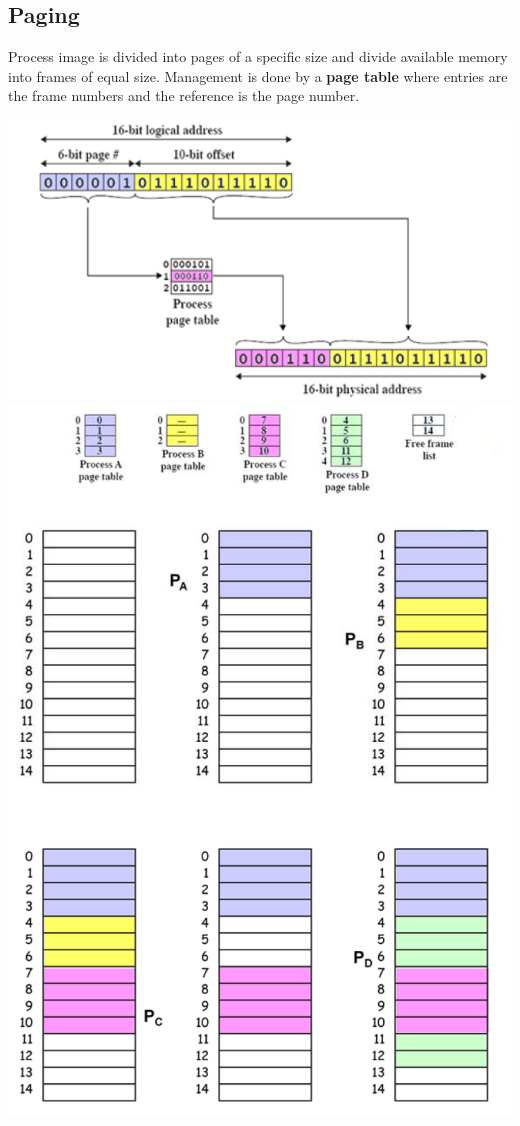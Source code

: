 	\subsection{Paging }
		Process image is divided into pages of a specific size and divide available memory into frames of equal size. Management is done by a \textbf{page table} where entries are the frame numbers and the reference is the page number. 
		
		\begin{multicols}{2}
			\includegraphics[scale=0.55]{./pictures/pagingAddressTrans.png} \\
			\includegraphics[scale=0.9]{./pictures/paging.png}
		\end{multicols}	
		